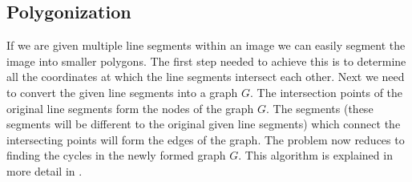\documentclass{article}
\begin{document}
\subsection{Polygonization}
If we are given multiple line segments within an image we can easily segment the image into smaller polygons. The first step needed to achieve this is to determine 
all the coordinates at which the line segments intersect each other. Next we need to convert the given line 
segments into a graph $G$. The intersection points of the original line segments form the nodes of the graph $G$. The segments (these segments will be different to the original given line segments)
which connect the intersecting points will form the edges of the graph. The problem now reduces to finding the cycles in the newly formed graph $G$. This algorithm is explained in more detail in \cite{ferreira2003}.
 
\end{document}
